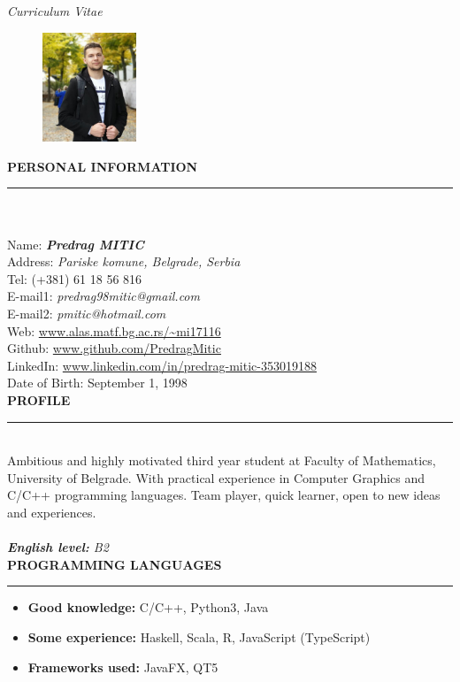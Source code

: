 \documentclass{article}
\begin{document}
\begin{center}
	\textit{\Huge Curriculum Vitae}   
	\vspace*{1cm}
\end{center}

\begin{figure} 
	\includegraphics[width=0.25\textwidth]{my_pic.jpeg}
\end{figure}

\color{my_col}
\textbf{\large PERSONAL INFORMATION}\\
\noindent\rule{10cm}{1.5pt}\color{black}\\ \\
Name:  \textbf{\emph{Predrag MITIC}} \\
Address: \emph{Pariske komune, Belgrade, Serbia }\\
Tel: 	(+381) 61 18 56 816 \\
E-mail1:	\textit{predrag98mitic@gmail.com} \\ 
E-mail2:	\textit{pmitic@hotmail.com} \\ 
Web:	\url{www.alas.matf.bg.ac.rs/~mi17116} \\
Github:	\url{www.github.com/PredragMitic} \\ 
LinkedIn: \url{www.linkedin.com/in/predrag-mitic-353019188}\\
Date of Birth: September 1, 1998 \\ 

\color{my_col}
\textbf{\large PROFILE}\\
\noindent\rule{15.4cm}{1.6pt}\color{black}\\ 
Ambitious and highly motivated third year student at Faculty of Mathematics, 
University of Belgrade. With practical experience in Computer Graphics and 
C/C++ programming languages. Team player, quick learner, open to new ideas and experiences.\\ \\
\textit{\textbf{English level: } B2}\\

\color{my_col}
\textbf{\large PROGRAMMING LANGUAGES}\\
\noindent\rule{15.4cm}{1.6pt}\color{black}
\normalsize
\begin{itemize}
	\item\textbf{Good knowledge: 	} C/C++, Python3, Java
	\item\textbf{Some experience:	} Haskell, Scala, R, JavaScript (TypeScript)
	\item\textbf{Frameworks used:} JavaFX, QT5\\
\end{itemize}
  
\end{document}
